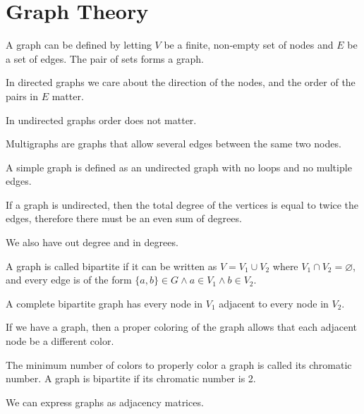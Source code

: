 \section{Graph Theory}
A graph can be defined by letting $V$ be a finite, non-empty set of nodes and $E$ be a set of edges. The pair of sets forms a graph.

In directed graphs we care about the direction of the nodes, and the order of the pairs in $E$ matter.

In undirected graphs order does not matter.

Multigraphs are graphs that allow several edges between the same two nodes.

A simple graph is defined as an undirected graph with no loops and no multiple edges.

If a graph is undirected, then the total degree of the vertices is equal to twice the edges, therefore there must be an even sum of degrees.

We also have out degree and in degrees.

A graph is called bipartite if it can be written as $V = V_1 \cup V_2$ where $V_1\cap V_2 = \varnothing$, and every edge is of the form $\{a,b\} \in G \wedge a \in V_1 \wedge b \in V_2$.

A complete bipartite graph has every node in $V_1$ adjacent to every node in $V_2$.

If we have a graph, then a proper coloring of the graph allows that each adjacent node be a different color.

The minimum number of colors to properly color a graph is called its chromatic number. A graph is bipartite if its chromatic number is 2.

We can express graphs as adjacency matrices.

